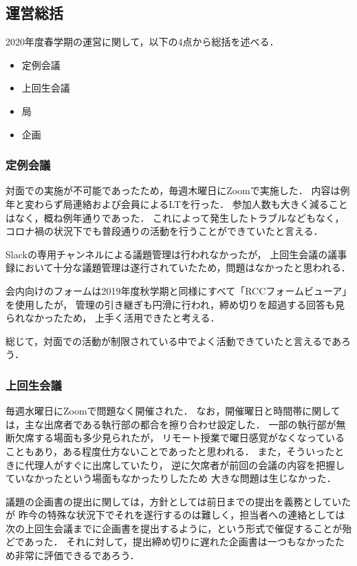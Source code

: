 \subsection*{運営総括}


2020年度春学期の運営に関して，以下の4点から総括を述べる．
\begin{itemize}
  \item 定例会議
  \item 上回生会議
  \item 局
  \item 企画
\end{itemize}

\subsubsection*{定例会議}
対面での実施が不可能であったため，毎週木曜日にZoomで実施した．
内容は例年と変わらず局連絡および会員によるLTを行った．
参加人数も大きく減ることはなく，概ね例年通りであった．
これによって発生したトラブルなどもなく，
コロナ禍の状況下でも普段通りの活動を行うことができていたと言える．

Slackの専用チャンネルによる議題管理は行われなかったが，
上回生会議の議事録において十分な議題管理は遂行されていたため，問題はなかったと思われる．

会内向けのフォームは2019年度秋学期と同様にすべて「RCCフォームビューア」を使用したが，
管理の引き継ぎも円滑に行われ，締め切りを超過する回答も見られなかったため，
上手く活用できたと考える．

総じて，対面での活動が制限されている中でよく活動できていたと言えるであろう．

\subsubsection*{上回生会議}
毎週水曜日にZoomで問題なく開催された．
なお，開催曜日と時間帯に関しては，主な出席者である執行部の都合を擦り合わせ設定した．
一部の執行部が無断欠席する場面も多少見られたが，
リモート授業で曜日感覚がなくなっていることもあり，ある程度仕方ないことであったと思われる．
また，そういったときに代理人がすぐに出席していたり，
逆に欠席者が前回の会議の内容を把握していなかったという場面もなかったりしたため
大きな問題は生じなかった．

議題の企画書の提出に関しては，方針としては前日までの提出を義務としていたが
昨今の特殊な状況下でそれを遂行するのは難しく，担当者への連絡としては
次の上回生会議までに企画書を提出するように，という形式で催促することが殆どであった．
それに対して，提出締め切りに遅れた企画書は一つもなかったため非常に評価できるであろう．

